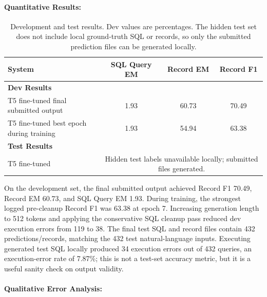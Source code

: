 \documentclass{article}
\begin{document}
\paragraph{Quantitative Results:}
\begin{table}[h!]
\centering
\begin{tabular}{lccc}
  \toprule
  System & SQL Query EM & Record EM & Record F1 \\
  \midrule
  \multicolumn{4}{l}{\textbf{Dev Results}} \\
  \midrule
  T5 fine-tuned final submitted output & 1.93 & 60.73 & 70.49 \\
  T5 fine-tuned best epoch during training & 1.93 & 54.94 & 63.38 \\
  \midrule
  \multicolumn{4}{l}{\textbf{Test Results}} \\
  \midrule
  T5 fine-tuned & \multicolumn{3}{c}{Hidden test labels unavailable locally; submitted files generated.} \\
  \bottomrule
\end{tabular}
\caption{Development and test results. Dev values are percentages. The hidden test set does not include local ground-truth SQL or records, so only the submitted prediction files can be generated locally.}
\label{tab:results}
\end{table}

On the development set, the final submitted output achieved Record F1 70.49, Record EM 60.73, and SQL Query EM 1.93. During training, the strongest logged pre-cleanup Record F1 was 63.38 at epoch 7. Increasing generation length to 512 tokens and applying the conservative SQL cleanup pass reduced dev execution errors from 119 to 38. The final test SQL and record files contain 432 predictions/records, matching the 432 test natural-language inputs. Executing generated test SQL locally produced 34 execution errors out of 432 queries, an execution-error rate of 7.87\%; this is not a test-set accuracy metric, but it is a useful sanity check on output validity.

\paragraph{Qualitative Error Analysis:}
\end{document}
